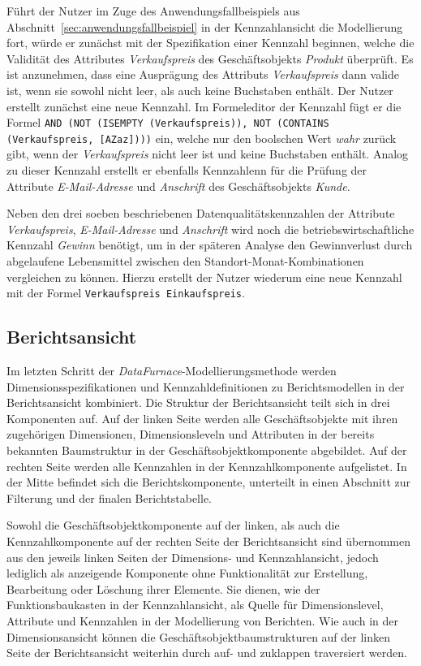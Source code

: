 \documentclass[
  language=german, %
  type=bachelor,%
  ngerman
]{isthesis}
\begin{document}
\begin{content}
  Führt der Nutzer im Zuge des Anwendungsfallbeispiels aus
  Abschnitt~\ref{sec:anwendungsfallbeispiel} in der Kennzahlansicht die
  Modellierung fort, würde er zunächst mit der Spezifikation einer Kennzahl
  beginnen, welche die Validität des Attributes \textit{Verkaufspreis} des
  Geschäftsobjekts \textit{Produkt} überprüft. Es ist anzunehmen, dass eine
  Ausprägung des Attributs \textit{Verkaufspreis} dann valide ist, wenn sie
  sowohl nicht leer, als auch keine Buchstaben enthält. Der Nutzer erstellt
  zunächst eine neue Kennzahl. Im Formeleditor der Kennzahl fügt er die Formel
  \texttt{AND (NOT (ISEMPTY (Verkaufspreis)), NOT (CONTAINS (Verkaufspreis,
  [A\textminus{}Za\textminus{}z])))} ein, welche nur den boolschen Wert
  \textit{wahr} zurück gibt, wenn der \textit{Verkaufspreis} nicht leer ist und
  keine Buchstaben enthält. Analog zu dieser Kennzahl erstellt er ebenfalls
  Kennzahlenn für die Prüfung der Attribute \textit{E-Mail-Adresse} und
  \textit{Anschrift} des Geschäftsobjekts \textit{Kunde}.

  Neben den drei soeben beschriebenen Datenqualitätskennzahlen der Attribute
  \textit{Verkaufspreis}, \textit{E-Mail-Adresse} und \textit{Anschrift} wird
  noch die betriebswirtschaftliche Kennzahl \textit{Gewinn} benötigt, um in der
  späteren Analyse den Gewinnverlust durch abgelaufene Lebensmittel zwischen
  den Standort-Monat-Kombinationen vergleichen zu können. Hierzu erstellt der
  Nutzer wiederum eine neue Kennzahl mit der Formel \texttt{Verkaufspreis \textminus{}
  Einkaufspreis}.


  \subsection{Berichtsansicht}

  Im letzten Schritt der \textit{DataFurnace}-Modellierungsmethode werden
  Dimensionsspezifikationen und Kennzahldefinitionen zu Berichtsmodellen in der
  Berichtsansicht kombiniert. Die Struktur der Berichtsansicht teilt sich in
  drei Komponenten auf. Auf der linken Seite werden alle Geschäftsobjekte mit
  ihren zugehörigen Dimensionen, Dimensionsleveln und Attributen in der
  bereits bekannten Baumstruktur in der Geschäftsobjektkomponente abgebildet.
  Auf der rechten Seite werden alle Kennzahlen in der Kennzahlkomponente
  aufgelistet. In der Mitte befindet sich die Berichtskomponente, unterteilt in
  einen Abschnitt zur Filterung und der finalen Berichtstabelle.

  Sowohl die Geschäftsobjektkomponente auf der linken, als auch die
  Kennzahlkomponente auf der rechten Seite der Berichtsansicht sind übernommen
  aus den jeweils linken Seiten der Dimensions- und Kennzahlansicht, jedoch
  lediglich als anzeigende Komponente ohne Funktionalität zur Erstellung,
  Bearbeitung oder Löschung ihrer Elemente. Sie dienen, wie der
  Funktionsbaukasten in der Kennzahlansicht, als Quelle für Dimensionslevel,
  Attribute und Kennzahlen in der Modellierung von Berichten. Wie auch in der
  Dimensionsansicht können die Geschäftsobjektbaumstrukturen auf der linken
  Seite der Berichtsansicht weiterhin durch auf- und zuklappen traversiert
  werden.


\end{content}
\end{document}
